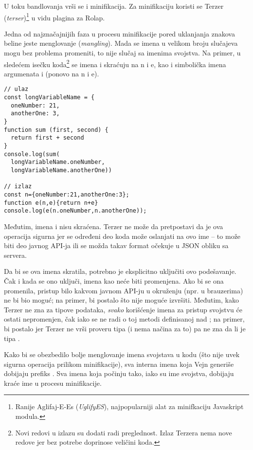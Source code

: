 U toku bandlovanja vrši se i minifikacija.
Za minifikaciju koristi se Terzer (\textsl{terser})\footnote{Ranije Aglifaj-E-Es (\textsl{UglifyES}), najpopularniji alat za minifkaciju Javaskript modula.} u vidu plagina za Rolap.

Jedna od najznačajnijih faza u procesu minifikacije pored uklanjanja znakova beline jeste menglovanje (\textsl{mangling}).
Mada se imena u velikom broju slučajeva mogu bez problema promeniti, to nije slučaj sa imenima svojstva.
Na primer, u sledećem isečku koda\footnote{Novi redovi u izlazu su dodati radi preglednost. Izlaz Terzera nema nove redove jer bez potrebe doprinose veličini koda.} se imena  i  skraćuju na \code n i \code e, kao i simbolička imena argumenata  i  (ponovo na \code n i \code e).

\begin{lstlisting}
// ulaz
const longVariableName = {
  oneNumber: 21,
  anotherOne: 3,
}
function sum (first, second) {
  return first + second
}
console.log(sum(
  longVariableName.oneNumber,
  longVariableName.anotherOne))

// izlaz
const n={oneNumber:21,anotherOne:3};
function e(n,e){return n+e}
console.log(e(n.oneNumber,n.anotherOne));
\end{lstlisting}

Međutim, imena  i  nisu skraćena. 
Terzer ne može da pretpostavi da je ova operacija sigurna jer se određeni deo koda može oslanjati na ovo ime -- to može biti deo javnog API-ja ili se možda takav format očekuje u JSON obliku sa servera.

Da bi se ova imena skratila, potrebno je eksplicitno uključiti ovo podešavanje.
Čak i kada se ono uključi,  imena kao  neće biti promenjena.
Ako bi se ona promenila, pristup bilo kakvom javnom API-ju u okruženju (npr.  u brauzerima) ne bi bio moguć; na primer,  bi postalo  što nije moguće izvršiti.
Međutim, kako Terzer ne zna za tipove podataka, \emph{svako} korišćenje imena  za pristup svojstvu će ostati nepromenjen, čak iako se ne radi o toj metodi definisanoj nad ; na primer,  bi postalo  jer Terzer ne vrši proveru tipa (i nema načina za to) pa ne zna da li je  tipa .

Kako bi se obezbedilo bolje menglovanje imena svojstava u kodu (što nije uvek sigurna operacija prilikom minifikacije), sva interna imena koja Vejn generiše dobijaju prefiks .
Sva imena koja počinju tako, iako su ime svojstva, dobijaju kraće ime u procesu minifikacije.
